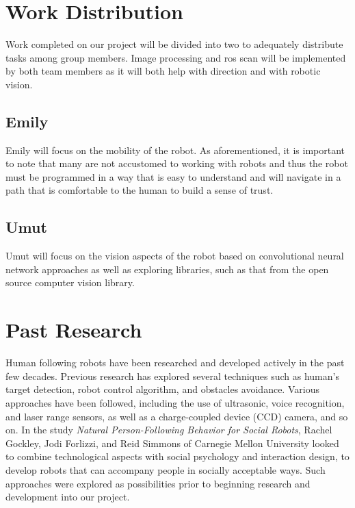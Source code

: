 \documentclass{ndjflart}
\theoremstyle{definition}
\theoremstyle{remark}
\begin{document}
\section{Work Distribution}\label{gandt} 
Work completed on our project will be divided into two to adequately distribute tasks among group members. Image processing and ros scan will be implemented by both team members as it will both help with direction and with robotic vision.

\subsection{Emily}\label{sseccommas} 
Emily will focus on the mobility of the robot. As aforementioned, it is important to note that many are not accustomed to working with robots and thus the robot must be programmed in a way that is easy to understand and will navigate in a path that is comfortable to the human to build a sense of trust.

\subsection{Umut}\label{sseclabel} 
Umut will focus on the vision aspects of the robot based on convolutional neural network approaches as well as exploring libraries, such as that from the open source computer vision library. 


\section{Past Research}\label{ams}
Human following robots have been researched and developed actively in the past few decades. Previous research has explored several techniques such as human’s target detection, robot control algorithm, and obstacles avoidance. Various approaches have been followed, including the use of ultrasonic, voice recognition, and laser range sensors, as well as a charge-coupled device (CCD) camera, and so on. In the study \textit{Natural Person-Following Behavior for Social Robots}, Rachel Gockley, Jodi Forlizzi, and Reid Simmons of Carnegie Mellon University looked to combine technological aspects with social psychology and interaction design, to develop robots that can accompany people in socially acceptable ways. Such approaches were explored as possibilities prior to beginning research and development into our project. 


% 
%

\end{document}

